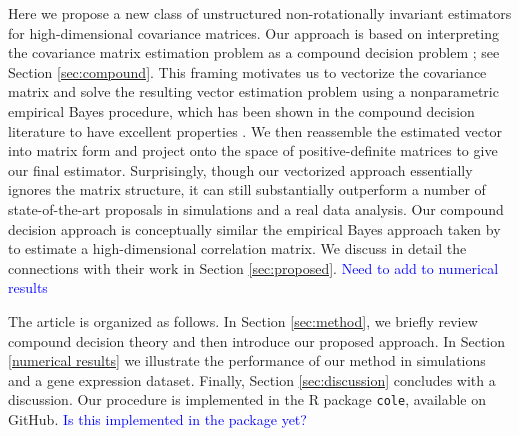 \documentclass[useAMS,referee,usenatbib]{biom}
\def\blue{\textcolor{blue}}
\begin{document}

Here we propose a new class of unstructured non-rotationally invariant estimators for high-dimensional covariance matrices. Our approach is based on interpreting the covariance matrix estimation problem as a compound decision problem \citep{robbins1951asymptotically}; see Section \ref{sec:compound}. This framing motivates us to vectorize the covariance matrix and solve the resulting vector estimation problem using a nonparametric empirical Bayes procedure, which has been shown in the compound decision literature to have excellent properties \citep{jiang2009general, koenker2014convex, efron2019bayes}. We then reassemble the estimated vector into matrix form and project onto the space of positive-definite matrices to give our final estimator. Surprisingly, though our vectorized approach essentially ignores the matrix structure, it can still substantially outperform a number of state-of-the-art proposals in simulations and a real data analysis. Our compound decision approach is conceptually similar the empirical Bayes approach taken by \citet{dey2018corshrink} to estimate a high-dimensional correlation matrix. We discuss in detail the connections with their work in Section \ref{sec:proposed}. \blue{Need to add to numerical results}

The article is organized as follows. In Section \eqref{sec:method}, we briefly review compound decision theory and then introduce our proposed approach. In Section \eqref{numerical results} we illustrate the performance of our method in simulations and a gene expression dataset. Finally, Section \eqref{sec:discussion} concludes with a discussion. Our procedure is implemented in the R package \verb|cole|, available on GitHub. \blue{Is this implemented in the package yet?}
\end{document}
